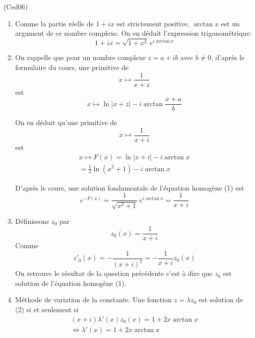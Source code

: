 \begin{tiny}(Ced06)\end{tiny} 
\begin{enumerate}
  \item Comme la partie réelle de $ 1 + ix$ est strictement positive, $\arctan x$ est un argument de ce nombre complexe. On en déduit l'expression trigonométrique:
\begin{displaymath}
  1 + ix = \sqrt{1+x^2} \, e^{i\arctan x}
\end{displaymath}

  \item On rappelle que pour un nombre complexe $z=a+ib$ avec $b\neq 0$, d'après le formulaire du cours, une primitive de 
\begin{displaymath}
  x\mapsto \frac{1}{x + z}
\end{displaymath}
est
\begin{displaymath}
  x\mapsto \ln |x+z| - i \arctan \frac{x + a}{b}
\end{displaymath}

On en déduit qu'une primitive de
\begin{displaymath}
  x\mapsto \frac{1}{x + i}
\end{displaymath}
est
\begin{multline*}
  x\mapsto F(x) = \ln |x+i| - i \arctan x \\
  = \frac{1}{2}\ln(x^2+1) -i\arctan x
\end{multline*}

D'après le cours, une solution fondamentale de l'équation homogène (1) est 
\begin{displaymath}
e^{-F(x)}=  \frac{1}{\sqrt{x^2+1}}\,e^{i\arctan x} = \frac{1}{x + i}
\end{displaymath}

  \item Définissons $z_0$ par 
\begin{displaymath}
  z_0(x) = \frac{1}{x + i}
\end{displaymath}
Comme
\begin{displaymath}
  z'_0(x) = -\frac{1}{(x + i)^2} = -\frac{1}{x+i}z_0(x)
\end{displaymath}
On retrouve le résultat de la question précédente c'est à dire que $z_0$ est solution de l'équation homogène (1).
  \item Méthode de variation de la constante. Une fonction $z=\lambda z_0$ est solution de (2) si et seulement si
\begin{multline*}
(x+i)\lambda'(x)z_0(x) = 1 + 2x\arctan x \\
\Leftrightarrow
\lambda'(x) = 1 + 2x\arctan x
\end{multline*}


\end{enumerate}
